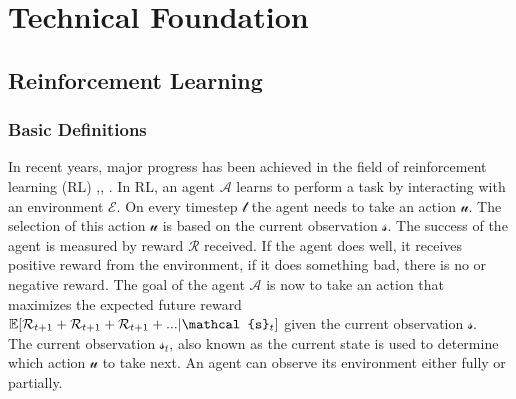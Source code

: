 %
%

\chapter{Technical Foundation}\label{chap.grundlagen}
\section{Reinforcement Learning}\label{projektmanagement}
\subsection*{Basic Definitions}\label{basic_rl_definitions}
In recent years, major progress has been achieved in the field of reinforcement learning (RL) \cite{mnih2013playing},\cite{alphazero}, \cite{hideandseek}.
In RL, an agent $\mathcal{A}$ learns to perform a task by interacting with an environment $\mathcal{E}$. On every timestep $\mathcal{t}$ the agent needs to take an action $\mathcal{u}$. The selection of this action $\mathcal{u}$ is based on the current observation $\mathcal{s}$. The success of the agent is measured by reward $\mathcal{R}$ received. If the agent does well, it receives positive reward from the environment, if it does something bad, there is no or negative reward. The goal of the agent $\mathcal{A}$ is now to take an action that maximizes the expected future reward  $\EX[\mathcal{R}_{t+1}+\mathcal{R}_{t+1}+\mathcal{R}_{t+1}+...|\mathcal{s}_{t}]$ given the current observation $\mathcal{s}$.\\
The current observation $\mathcal{s}_{t}$, also known as the current state is used to determine which action $\mathcal{u}$ to take next. An agent can observe its environment either fully or partially.


